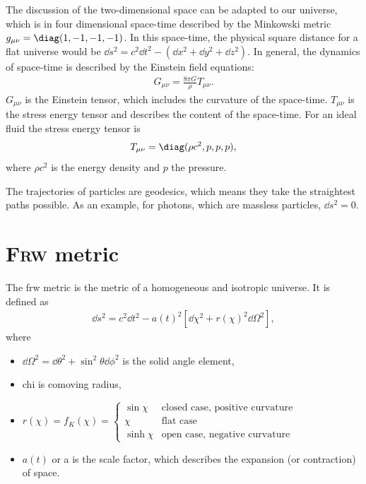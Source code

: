 The discussion of the two-dimensional space can be adapted to our universe, which is in four dimensional space-time described by the Minkowski metric $g_{\mu\nu} = \diag(1, -1, -1, -1)$. In this space-time, the physical square distance for a flat universe would be $\dd{s}^2 = c^2\dd{t}^2- (\dd{x}^2 + \dd{y}^2 + \dd{z}^2)$. In general, the dynamics of space-time is described by the Einstein field equations:
\begin{align*}
	G_{\mu\nu} = \frac{8\pi G}{\rho} T_{\mu\nu}.
\end{align*}
$G_{\mu\nu}$ is the Einstein tensor, which includes the curvature of the space-time. $T_{\mu\nu}$ is the stress energy tensor and describes the content of the space-time. For an ideal fluid the stress energy tensor is
\begin{align*}
	T_{\mu\nu} = \diag(\rho c^2, p, p, p),
\end{align*}
where $\rho c^2$ is the energy density and $p$ the pressure. 

The trajectories of particles are geodesics, which means they take the straightest paths possible. As an example, for photons, which are massless particles, $\dd{s}^2 = 0$.



\section{\textsc{Frw} metric}

The \ac{frw} metric is the metric of a homogeneous and isotropic universe.
It is defined as
\begin{align*}
  \dd{s}^2 = c^2 \dd{t}^2 - a(t)^2 \left[ \dd{\chi}^2 + r(\chi)^2 \dd{\Omega}^2 \right],
\end{align*}
where
\begin{itemize}[nolistsep]
	\item $\dd{\Omega}^2 = \dd{\theta}^2 + \sin^2\theta \dd{\phi}^2$ is the solid angle element,
	\item \gls{chi} is comoving radius,
	\item $\displaystyle
		r(\chi) = f_K(\chi) = 
		\begin{cases}
			\sin \chi & \text{closed case, positive curvature}\\
			\chi & \text{flat case}\\
			\sinh \chi & \text{open case, negative curvature}
		\end{cases}
		$
	\item $a(t)$ or \gls{a} is the scale factor, which describes the expansion (or contraction) of space.
\end{itemize}

